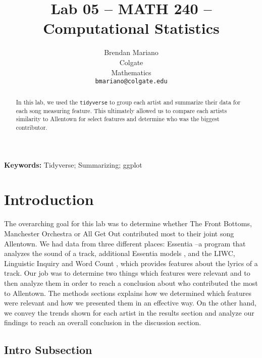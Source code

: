 \documentclass{article}\usepackage[]{graphicx}\usepackage[]{xcolor}
\begin{document}
\vspace{-1in}
\title{Lab 05 -- MATH 240 -- Computational Statistics}

\author{
  Brendan Mariano \\
  Colgate  \\
  Mathematics  \\
  {\tt bmariano@colgate.edu}
}

\date{}

\maketitle

\begin{multicols}{2}
\begin{abstract}
In this lab, we used the \texttt{tidyverse} to group each artist and summarize their data for each song measuring feature. This ultimately allowed us to compare each artists similarity to Allentown for select features and determine who was the biggest contributor. 
\end{abstract}

\noindent \textbf{Keywords:} Tidyverse; Summarizing; ggplot

\section{Introduction}
The overarching goal for this lab was to determine whether The Front Bottoms, Manchester Orchestra or All Get Out contributed most to their joint song Allentown. We had data from three different places: Essentia \citep{essentia}--a program that analyzes the sound of a track, additional Essentia models \citep{essentia_models}, and the LIWC, Linguistic Inquiry and Word Count \citep{liwc}, which provides features about the lyrics of a track. Our job was to determine two things which features were relevant and to then analyze them in order to reach a conclusion about who contributed the most to Allentown. 
  The methods sections explains how we determined which features were relevant and how we presented them in an effective way. On the other hand, we convey the trends shown for each artist in the results section and analyze our findings to reach an overall conclusion in the discussion section. 


\subsection{Intro Subsection}




\end{multicols}
\end{document}
